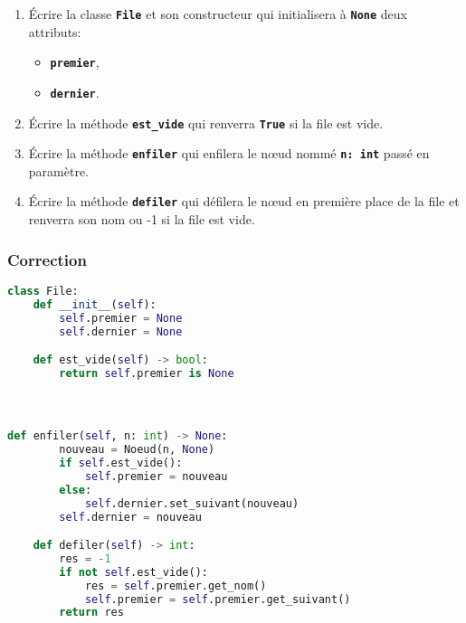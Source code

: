 \documentclass[svgnames,11pt]{beamer}
\begin{document}
\begin{frame}

    \begin{activite}
    \begin{enumerate}
        \item Écrire la classe \textbf{\texttt{File}} et son constructeur qui initialisera à \textbf{\texttt{None}} deux attributs:
        \begin{itemize}
            \item \textbf{\texttt{premier}},
            \item \textbf{\texttt{dernier}}.
        \end{itemize}
        \item Écrire la méthode \textbf{\texttt{est\_vide}} qui renverra \textbf{\texttt{True}} si la file est vide.
        \item Écrire la méthode \textbf{\texttt{enfiler}} qui enfilera le nœud nommé \textbf{\texttt{n: int}} passé en paramètre.
        \item Écrire la méthode \textbf{\texttt{defiler}} qui défilera le nœud en première place de la file et renverra son nom ou -1 si la file est vide.
    \end{enumerate}
    \end{activite}

\end{frame}
\begin{frame}[fragile]
    \frametitle{Correction}
\begin{center}
\begin{lstlisting}[language=Python , basicstyle=\ttfamily\small, xleftmargin=2em, xrightmargin=2em]
class File:
    def __init__(self):
        self.premier = None
        self.dernier = None

    def est_vide(self) -> bool:
        return self.premier is None

    
\end{lstlisting}
\end{center}
    

\end{frame}
\begin{frame}[fragile]
    \frametitle{}

\begin{center}
\begin{lstlisting}[language=Python , basicstyle=\ttfamily\small, xleftmargin=0.2em, xrightmargin=-1em]
    def enfiler(self, n: int) -> None:
        nouveau = Noeud(n, None)
        if self.est_vide():
            self.premier = nouveau
        else:
            self.dernier.set_suivant(nouveau)
        self.dernier = nouveau

    def defiler(self) -> int:
        res = -1
        if not self.est_vide():
            res = self.premier.get_nom()
            self.premier = self.premier.get_suivant()
        return res
\end{lstlisting}
\end{center} 

\end{frame}
\end{document}
